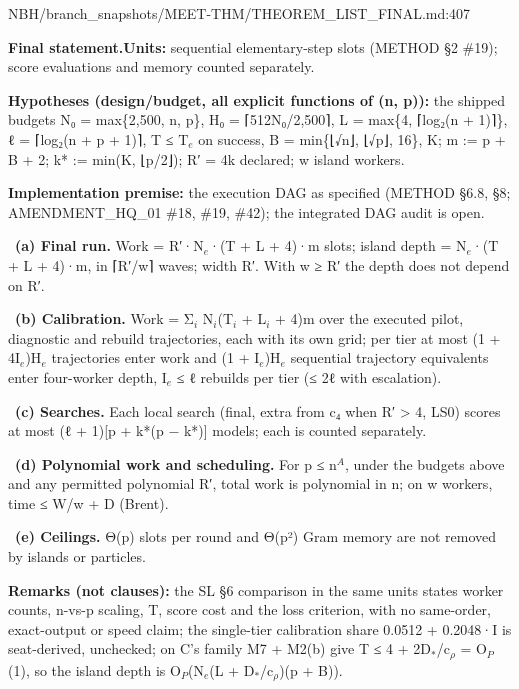 \begin{stmt}{NBH/branch_snapshots/MEET-THM/THEOREM_LIST_FINAL.md:407}
\par\smallskip\noindent\textbf{Final statement.}\enspace \textbf{Units:} sequential elementary-step slots (METHOD §2 \#19); score evaluations and memory counted separately. \par \textbf{Hypotheses (design/budget, all explicit functions of (n, p)):} the shipped budgets N₀ = max\{2,500, n, p\}, H₀ = ⌈512N₀/2,500⌉, L = max\{4, ⌈log₂(n + 1)⌉\}, ℓ = ⌈log₂(n + p + 1)⌉, T ≤ T$_{e}$ on success, B = min\{⌊√n⌋, ⌊√p⌋, 16\}, K; m := p + B + 2; k* := min(K, ⌊p/2⌋); R′ = 4k declared; w island workers. \par \textbf{Implementation premise:} the execution DAG as specified (METHOD §6.8, §8; AMENDMENT\_HQ\_01 \#18, \#19, \#42); the integrated DAG audit is open. \par {}\ \textbf{(a) Final run.} Work = R′·N$_{e}$·(T + L + 4)·m slots; island depth = N$_{e}$·(T + L + 4)·m, in ⌈R′/w⌉ waves; width R′. With w ≥ R′ the depth does not depend on R′. \par {}\ \textbf{(b) Calibration.} Work = Σ$_{i}$ N$_{i}$(T$_{i}$ + L$_{i}$ + 4)m over the executed pilot, diagnostic and rebuild trajectories, each with its own grid; per tier at most (1 + 4I$_{e}$)H$_{e}$ trajectories enter work and (1 + I$_{e}$)H$_{e}$ sequential trajectory equivalents enter four-worker depth, I$_{e}$ ≤ ℓ rebuilds per tier (≤ 2ℓ with escalation). \par {}\ \textbf{(c) Searches.} Each local search (final, extra from c₄ when R′ \textgreater{} 4, LS0) scores at most (ℓ + 1)[p + k*(p − k*)] models; each is counted separately. \par {}\ \textbf{(d) Polynomial work and scheduling.} For p ≤ n$^{A}$, under the budgets above and any permitted polynomial R′, total work is polynomial in n; on w workers, time ≤ W/w + D (Brent). \par {}\ \textbf{(e) Ceilings.} Θ(p) slots per round and Θ(p²) Gram memory are not removed by islands or particles. \par \textbf{Remarks (not clauses):} the SL §6 comparison in the same units states worker counts, n-vs-p scaling, T, score cost and the loss criterion, with no same-order, exact-output or speed claim; the single-tier calibration share 0.0512 + 0.2048·I is seat-derived, unchecked; on C's family M7 + M2(b) give T ≤ 4 + 2D$_{*}$/c$_{ρ}$ = O$_{P}$(1), so the island depth is O$_{P}$(N$_{e}$(L + D$_{*}$/c$_{ρ}$)(p + B)).
\end{stmt}


